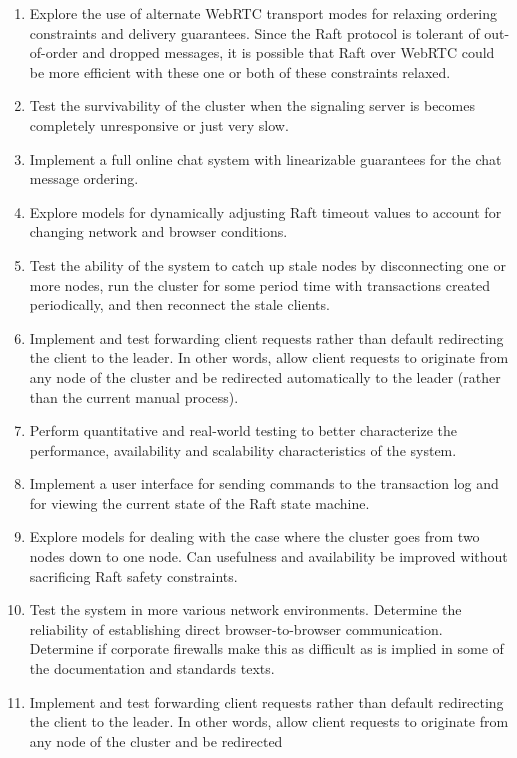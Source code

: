 \documentclass{acmtog} %
\begin{document}
\begin{enumerate}
\item Explore the use of alternate WebRTC transport modes for relaxing
  ordering constraints and delivery guarantees. Since the Raft
  protocol is tolerant of out-of-order and dropped messages, it is
  possible that Raft over WebRTC could be more efficient with these
  one or both of these constraints relaxed.
\item Test the survivability of the cluster when the signaling server is
  becomes completely unresponsive or just very slow.
\item Implement a full online chat system with linearizable guarantees for
  the chat message ordering.
\item Explore models for dynamically adjusting Raft timeout values to
  account for changing network and browser conditions.
\item Test the ability of the system to catch up stale nodes by
  disconnecting one or more nodes, run the cluster for some period
  time with transactions created periodically, and then reconnect the stale
  clients.
\item Implement and test forwarding client requests rather than default
  redirecting the client to the leader. In other words, allow client
  requests to originate from any node of the cluster and be redirected
  automatically to the leader (rather than the current manual
  process).
\item Perform quantitative and real-world testing to better characterize
  the performance, availability and scalability characteristics of the
  system.
\item Implement a user interface for sending commands to the transaction
  log and for viewing the current state of the Raft state machine.
\item Explore models for dealing with the case where the cluster goes from
  two nodes down to one node. Can usefulness and availability be
  improved without sacrificing Raft safety constraints.
\item Test the system in more various network environments. Determine the
  reliability of establishing direct browser-to-browser communication.
  Determine if corporate firewalls make this as difficult as is
  implied in some of the documentation and standards texts.
\item Implement and test forwarding client requests rather than default
  redirecting the client to the leader. In other words, allow client
  requests to originate from any node of the cluster and be redirected

\end{enumerate}
\end{document}
